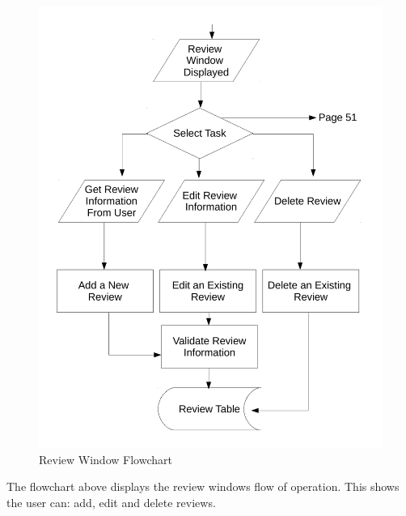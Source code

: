 \begin{figure}[H]
    \includegraphics[width=\textwidth]{./Design/ReviewFlowchart.pdf}
    \caption{Review Window Flowchart} \label{fig:Review Flowchart}
\end{figure}

The flowchart above displays the review windows flow of operation. This shows the user can: add, edit and delete reviews.


